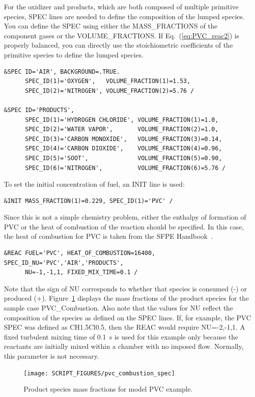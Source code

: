 \documentclass[11pt]{book}
\begin{document}
For the oxidizer and products, which are both composed of multiple primitive species, {\ct SPEC} lines are needed to define the composition of the lumped species. You can define the {\ct SPEC} using either the {\ct MASS\_FRACTIONS} of the component gases or the {\ct VOLUME\_FRACTIONS}. If Eq.~(\ref{eq:PVC_reac2}) is properly balanced, you can directly use the stoichiometric coefficients of the primitive species to define the lumped species.
\begin{lstlisting}
&SPEC ID='AIR', BACKGROUND=.TRUE.
      SPEC_ID(1)='OXYGEN',   VOLUME_FRACTION(1)=1.53,
      SPEC_ID(2)='NITROGEN', VOLUME_FRACTION(2)=5.76 /

&SPEC ID='PRODUCTS',
      SPEC_ID(1)='HYDROGEN CHLORIDE', VOLUME_FRACTION(1)=1.0,
      SPEC_ID(2)='WATER VAPOR',       VOLUME_FRACTION(2)=1.0,
      SPEC_ID(3)='CARBON MONOXIDE',   VOLUME_FRACTION(3)=0.14,
      SPEC_ID(4)='CARBON DIOXIDE',    VOLUME_FRACTION(4)=0.96,
      SPEC_ID(5)='SOOT',              VOLUME_FRACTION(5)=0.90,
      SPEC_ID(6)='NITROGEN',          VOLUME_FRACTION(6)=5.76 /
\end{lstlisting}
To set the initial concentration of fuel, an {\ct INIT} line is used:
\begin{lstlisting}
&INIT MASS_FRACTION(1)=0.229, SPEC_ID(1)='PVC' /
\end{lstlisting}
Since this is not a simple chemistry problem, either the enthalpy of formation of PVC or the heat of combustion of the reaction should be specified. In this case, the heat of combustion for PVC is taken from the SFPE Handbook~\cite{SFPE:Tewarson}.
\begin{lstlisting}
&REAC FUEL='PVC', HEAT_OF_COMBUSTION=16400, SPEC_ID_NU='PVC','AIR','PRODUCTS',
      NU=-1,-1,1, FIXED_MIX_TIME=0.1 /
\end{lstlisting}
Note that the sign of {\ct NU} corresponds to whether that species is consumed (-) or produced (+). Figure~\ref{pvc_combustion} displays the mass fractions of the product species for the sample case {\ct PVC\_Combustion}. Also note that the values for {\ct NU} reflect the composition of the species as defined on the {\ct SPEC} lines. If, for example, the PVC {\ct SPEC} was defined as {\ct CH1.5Cl0.5}, then the {\ct REAC} would require {\ct NU=-2,-1,1}. A fixed turbulent mixing time of 0.1~s is used for this example only because the reactants are initially mixed within a chamber with no imposed flow. Normally, this parameter is not necessary.

\begin{figure}[ht]
\centering \texttt{[image: SCRIPT\_FIGURES/pvc\_combustion\_spec]}
\caption[Results of the {\ct pvc\_combustion} test case]{Product species mass fractions for model PVC example.}
\label{pvc_combustion}
\end{figure}
\end{document}
